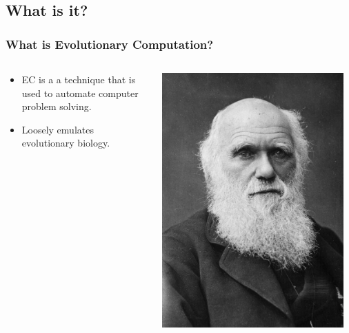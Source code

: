 \documentclass{beamer}
\begin{document}
\subsection[Evolutionary Computation]{What is it?}

\begin{frame}
  \frametitle{What is Evolutionary Computation?}
  \begin{columns}
  \begin{column}{0.6\textwidth}
  \begin{itemize}
  	\item EC is a a technique that is used to automate computer problem solving.
  	\item Loosely emulates evolutionary biology.
  \end{itemize}
  \end{column}
  \begin{column}{0.4\textwidth}
   \includegraphics[width=0.95\textwidth]{Illustrations/darwin.jpg}
       \\
  \end{column}
  \end{columns}
\end{frame}
\end{document}
